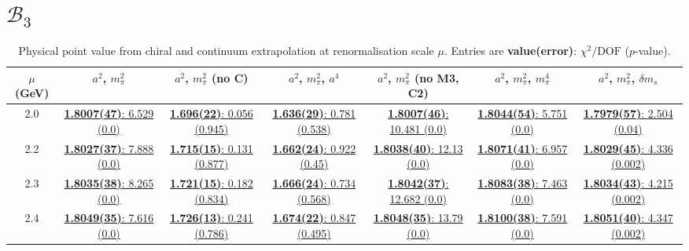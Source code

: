 \documentclass[12pt]{extarticle}
\begin{document}
\section{$\mathcal{B}_3$}
\begin{table}[h!]
\begin{center}
\begin{tabular}{|c|c|c|c|c|c|c|}
\hline
$\mu$ (GeV) & $a^2$, $m_\pi^2$& $a^2$, $m_\pi^2$ (no C)& $a^2$, $m_\pi^2$, $a^4$& $a^2$, $m_\pi^2$ (no M3, C2)& $a^2$, $m_\pi^2$, $m_\pi^4$& $a^2$, $m_\pi^2$, $\delta m_s$\\
\hline
2.0& \hyperlink{SSmPP/NPR/bag_a2m2_20.pdf.1}{\textbf{1.8007(47)}: 6.529 (0.0)} & \hyperlink{SSmPP/NPR/bag_a2m2noC_20.pdf.1}{\textbf{1.696(22)}: 0.056 (0.945)} & \hyperlink{SSmPP/NPR/bag_a2a4m2_20.pdf.1}{\textbf{1.636(29)}: 0.781 (0.538)} & \hyperlink{SSmPP/NPR/bag_a2m2mcut_20.pdf.1}{\textbf{1.8007(46)}: 10.481 (0.0)} & \hyperlink{SSmPP/NPR/bag_a2m2m4_20.pdf.1}{\textbf{1.8044(54)}: 5.751 (0.0)} & \hyperlink{SSmPP/NPR/bag_a2m2delm_20.pdf.1}{\textbf{1.7979(57)}: 2.504 (0.04)}\\
2.2& \hyperlink{SSmPP/NPR/bag_a2m2_22.pdf.1}{\textbf{1.8027(37)}: 7.888 (0.0)} & \hyperlink{SSmPP/NPR/bag_a2m2noC_22.pdf.1}{\textbf{1.715(15)}: 0.131 (0.877)} & \hyperlink{SSmPP/NPR/bag_a2a4m2_22.pdf.1}{\textbf{1.662(24)}: 0.922 (0.45)} & \hyperlink{SSmPP/NPR/bag_a2m2mcut_22.pdf.1}{\textbf{1.8038(40)}: 12.13 (0.0)} & \hyperlink{SSmPP/NPR/bag_a2m2m4_22.pdf.1}{\textbf{1.8071(41)}: 6.957 (0.0)} & \hyperlink{SSmPP/NPR/bag_a2m2delm_22.pdf.1}{\textbf{1.8029(45)}: 4.336 (0.002)}\\
2.3& \hyperlink{SSmPP/NPR/bag_a2m2_23.pdf.1}{\textbf{1.8035(38)}: 8.265 (0.0)} & \hyperlink{SSmPP/NPR/bag_a2m2noC_23.pdf.1}{\textbf{1.721(15)}: 0.182 (0.834)} & \hyperlink{SSmPP/NPR/bag_a2a4m2_23.pdf.1}{\textbf{1.666(24)}: 0.734 (0.568)} & \hyperlink{SSmPP/NPR/bag_a2m2mcut_23.pdf.1}{\textbf{1.8042(37)}: 12.682 (0.0)} & \hyperlink{SSmPP/NPR/bag_a2m2m4_23.pdf.1}{\textbf{1.8083(38)}: 7.463 (0.0)} & \hyperlink{SSmPP/NPR/bag_a2m2delm_23.pdf.1}{\textbf{1.8034(43)}: 4.215 (0.002)}\\
2.4& \hyperlink{SSmPP/NPR/bag_a2m2_24.pdf.1}{\textbf{1.8049(35)}: 7.616 (0.0)} & \hyperlink{SSmPP/NPR/bag_a2m2noC_24.pdf.1}{\textbf{1.726(13)}: 0.241 (0.786)} & \hyperlink{SSmPP/NPR/bag_a2a4m2_24.pdf.1}{\textbf{1.674(22)}: 0.847 (0.495)} & \hyperlink{SSmPP/NPR/bag_a2m2mcut_24.pdf.1}{\textbf{1.8048(35)}: 13.79 (0.0)} & \hyperlink{SSmPP/NPR/bag_a2m2m4_24.pdf.1}{\textbf{1.8100(38)}: 7.591 (0.0)} & \hyperlink{SSmPP/NPR/bag_a2m2delm_24.pdf.1}{\textbf{1.8051(40)}: 4.347 (0.002)}\\
\hline
\end{tabular}
\caption{Physical point value from chiral and continuum extrapolation at renormalisation scale $\mu$. Entries are \textbf{value(error)}: $\chi^2/\text{DOF}$ ($p$-value).}
\end{center}
\end{table}
\end{document}
